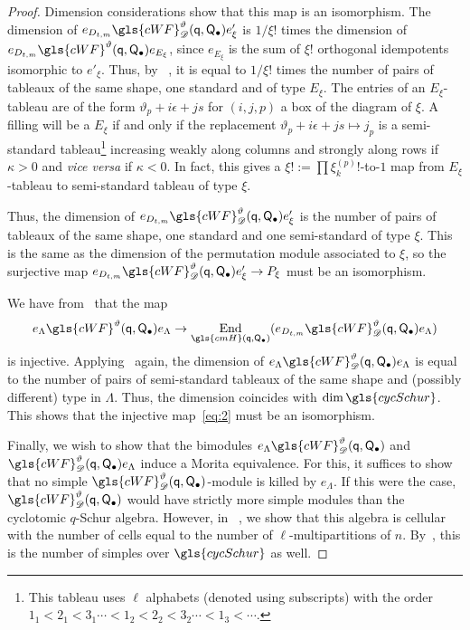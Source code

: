 \documentclass[ALCO,ThmDefs,Unicode,epreuves]{cedram}
\DeclareMathOperator{\End}{End}
\newcommand{\pq}{\mathsf{q}}
\newcommand{\PQ}{\mathsf{Q}}
\begin{document}
\begin{proof}
 Dimension considerations show that this map is an isomorphism. 
The dimension of $e_{D_{t,m}}\gls{cWF}^\vartheta_\mathscr{D}
 (\pq,\PQ_{\bullet}) e'_\xi$ is $1/\xi! $ times the
 dimension of $e_{D_{t,m}}\gls{cWF}^\vartheta
 (\pq,\PQ_{\bullet}) e_{E_\xi}$, since $e_{E_\xi}$ is the sum of
 $\xi! $ orthogonal idempotents isomorphic to $e'_\xi$. Thus, by
~\cite[Thm.~2.26]{WebRou}, it is equal to $1/\xi!$ times the
number of pairs of tableaux of the same shape, one standard and of
type $E_{\xi}$. 
 The entries of an $E_{\xi}$-tableau are of the form 
$\vartheta_p+i\epsilon+js$ for $(i,j,p)$ a box of the diagram of
$\xi$. A filling will be a $E_{\xi}$ if and only if the replacement
$\vartheta_p+i\epsilon+js\mapsto j_p$ is a semi-standard
tableau\footnote{This tableau uses $\ell$ alphabets (denoted using
 subscripts) with the order $1_1<2_1<3_1\cdots< 1_2<2_2<3_2\cdots<1_3<\cdots.$} increasing weakly along columns and strongly
 along rows if $\kappa>0$ and \emph{vice versa} if $\kappa<0$. In
 fact, this gives a $\xi!:=\prod \xi^{(p)}_k!$-to-$1$ map from
 $E_\xi$-tableau to semi-standard tableau of type $\xi$. 

Thus, the dimension of $e_{D_{t,m}}\gls{cWF}^\vartheta_\mathscr{D}
 (\pq,\PQ_{\bullet}) e'_\xi$ is the number of pairs of tableaux of
the same shape, one standard and one
semi-standard of type $\xi$. This is the same as the dimension of the
permutation module associated to $\xi$, so the surjective map $e_{D_{t,m}}\gls{cWF}^\vartheta_\mathscr{D}
 (\pq,\PQ_{\bullet}) e'_\xi\to P_{\xi}$ must be an isomorphism.

We have from~\cite[Lem.~3.3]{WebRou} that the map
\begin{equation}
e_\Lambda \gls{cWF}^\vartheta
 (\pq,\PQ_{\bullet})e_\Lambda \to \End_{\gls{cmH}(\pq,\PQ_\bullet)}(e_{D_{t,m}}\gls{cWF}^\vartheta_\mathscr{D}
 (\pq,\PQ_{\bullet}) e_\Lambda )\label{eq:2}
\end{equation}
is injective. Applying~\cite[Thm.~2.26]{WebRou} again, the
dimension of $e_\Lambda \gls{cWF}^\vartheta_\mathscr{D}
(\pq,\PQ_{\bullet})e_\Lambda $ is equal to the number of pairs of
semi-standard tableaux of the same shape and (possibly different) type
in $\Lambda$. Thus, the dimension coincides with $\dim
\gls{cycSchur}$. This shows that the injective map~\eqref{eq:2} must be
an isomorphism.

 Finally, we wish to show that the bimodules $e_\Lambda \gls{cWF}^\vartheta_\mathscr{D}
 (\pq,\PQ_{\bullet})$ and $\gls{cWF}^\vartheta_\mathscr{D}
 (\pq,\PQ_{\bullet})e_\Lambda $ induce a Morita equivalence. For this, it
 suffices to show that no simple $\gls{cWF}^\vartheta_\mathscr{D}
 (\pq,\PQ_{\bullet})$-module is killed by $e_\Lambda $. If this were the
 case, $\gls{cWF}^\vartheta_\mathscr{D}
 (\pq,\PQ_{\bullet})$ would have strictly more simple modules than the
 cyclotomic $q$-Schur algebra. However, in
~\cite[Thm.~2.26]{WebRou}, we show that this algebra is
 cellular with the number of cells equal to the number of
 $\ell$-multipartitions of $n$. By~\cite[6.16]{DJM}, this is the
 number of simples over $\gls{cycSchur}$ as well.
\end{proof}
\end{document}
